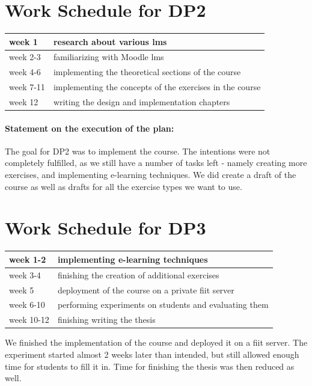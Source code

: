 \newpage

\section{Work Schedule for DP2}
\begin{tabular}{|l||l|}
\hline
week 1     & research about various \ac{lms}  \\
\hline
week 2-3     & familiarizing with Moodle \ac{lms} \\
\hline
week 4-6     & implementing the theoretical sections of the course \\
\hline
week 7-11      & implementing the concepts of the exercises in the course  \\
\hline
week 12   & writing the design and implementation chapters  \\
\hline
\end{tabular}

\paragraph{Statement on the execution of the plan:} 

The goal for DP2 was to implement the course. The intentions were not completely fulfilled, as we still have a number of tasks left - namely creating more exercises, and implementing e-learning techniques. We did create a draft of the course as well as drafts for all the exercise types we want to use.


\newpage

\section{Work Schedule for DP3}
\begin{tabular}{|l||l|}
\hline
week 1-2     &  implementing e-learning techniques \\
\hline
week 3-4     & finishing the creation of additional exercises \\
\hline
week 5     & deployment of the course on a private \ac{fiit} server \\
\hline
week 6-10      & performing experiments on students and evaluating them  \\
\hline
week 10-12   & finishing writing the thesis  \\
\hline
\end{tabular}

We finished the implementation of the course and deployed it on a \ac{fiit} server. The experiment started almost 2 weeks later than intended, but still allowed enough time for students to fill it in. Time for finishing the thesis was then reduced as well.

